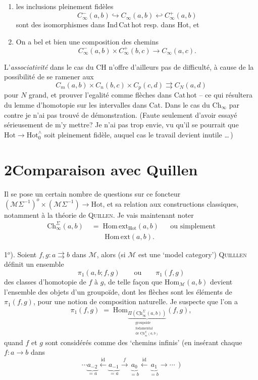 \documentclass[11pt]{article}
\newcommand{\printedpage}[1]{\marginpar{\footnotesize p.~#1}}
\newcommand{\msp}[1]{\marginpar{\footnotesize [#1]}}
\newcommand{\Ch}{\mathrm{Ch}}
\newcommand{\Hot}{\mathrm{Hot}}
\newcommand{\HotO}{\mathrm{Hot}_0^{\wedge}}
\newcommand{\M}{\mathcal{M}}
\newcommand{\uCh}{\underline{\mathrm{Ch}}}
\newcommand{\Homext}{\mathrm{Hom\,ext}}
\begin{document}
\begin{enumerate}
\item[a)] les inclusions pleinement fidèles
\[
C^{-}_{\infty}(a,b)\hookrightarrow C_{\infty}(a,b)\hookleftarrow C^{+}_{\infty}(a,b)
\]
sont des isomorphismes dans Ind\,Cat\,hot resp. dans Hot, et
\item[b)] On a bel et bien une composition des chemins
\[
C^{-}_{\infty}(a,b)\times C^{+}_{\infty}(b,c)\longrightarrow C_{\infty}(a,c).
\]
\end{enumerate}

L'\textit{associativité} dans le cas du CH n'offre d'ailleurs pas de difficulté, à cause de la possibilité de se ramener aux
\[
C_m(a,b)\times C_n(b,c)\times C_p(c,d)\rightrightarrows C_N(a,d)
\]
pour $N$ grand, et prouver l'egalité comme flèches dans Cat\,hot -- ce qui résultera du lemme %
d'homotopie sur les intervalles dans Cat. Dans le cas du $\mathrm{Ch}_{\infty}$ par contre je n'ai pas trouvé de démonstration. (Faute seulement d'avoir essayé sérieusement de m'y mettre? Je n'ai pas trop envie, vu qu'il se pourrait que $\mathrm{Hot}\longrightarrow\HotO$ soit pleinement fidèle, auquel cas le travail devient inutile \dots\,)

\printedpage{9}

\msp{page 14}

\section*{2\quad Comparaison avec Quillen}

Il se pose un certain nombre de questions sur ce foncteur $(\M\Sigma^{-1})^o \times (\M\Sigma^{-1}) \longrightarrow \Hot$, et sa relation aux constructions classiques, notamment à la théorie de \textsc{Quillen}. Je vais maintenant noter
\[
\begin{aligned}
\Ch^{\Sigma}_{\infty}(a,b) \;&=\; \Homext_{\Hot}(a,b) && \text{ou simplement}\\
&\phantom{\;=\;} \Homext(a,b).
\end{aligned}
\]

1$^o$). Soient $f,g : a \rightrightarrows b$ dans $\M$, alors (si $\M$ est une `model category') \textsc{Quilllen} définit un ensemble %
\[
\pi_1(a,b;f,g) \qquad \text{ou} \qquad \pi_1(f,g)
\]
des classes d'homotopie de $f$ à $g$, de telle façon que $\mathrm{Hom}_{\M}(a,b)$ devient l'ensemble des objets d'un groupoïde, dont les flèches sont les éléments de $\pi_1(f,g)$, pour une notion de composition naturelle. Je suspecte que l'on a
\[
\pi_1(f,g) \;=\; \mathrm{Hom}_{\underbrace{\Pi(\uCh^{\Sigma}_{\infty}(a,b))}_{\substack{\text{groupoïde}\\ \text{fodamental}\\ \text{de } \uCh^{\Sigma}_{\infty}(a,b)}}}(f,g), %
\]
quand $f$ et $g$ sont considérés comme des `chemins infinis' (en insérant chaque $f : a \longrightarrow b$ dans
\[
\cdots \underbrace{a_{-2}}_{=a} \xleftarrow{\ \mathrm{id}\ } \underbrace{a_{-1}}_{=a} \xrightarrow{\ f\ } \underbrace{a_{0}}_{=b} \xleftarrow{\ \mathrm{id}\ } \underbrace{a_{1}}_{=b} \longrightarrow \cdots\ \ )
\]
\end{document}
